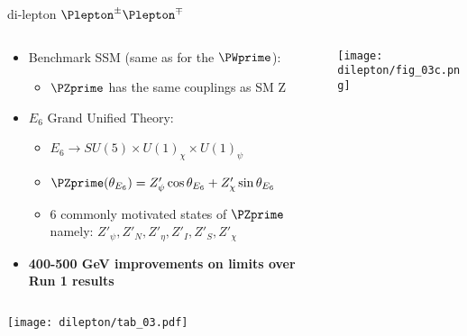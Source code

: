\documentclass[8pt]{beamer}
\begin{document}
\begin{frame}{\large di-lepton $\Plepton^{\pm}\Plepton^{\mp}$}

\begin{columns}
  \begin{column}{5.5cm}
  
  \begin{itemize}
    \item Benchmark SSM (same as for the $\PWprime$):
    \begin{itemize}
      \item $\PZprime$ has the same couplings as SM Z
    \end{itemize}
    \item $E_6$ Grand Unified Theory:
    \begin{itemize}
      \item $E_6 \rightarrow SU(5) \times U(1)_{\chi} \times U(1)_{\psi}$
      \item $\PZprime(\theta_{E_6}) = Z'_{\psi}\cos\theta_{E_6} + Z'_{\chi}\sin\theta_{E_6}$
      \item 6 commonly motivated states of $\PZprime$ namely:
	    $Z'_{\psi}, Z'_{N}, Z'_{\eta}, Z'_{I}, Z'_{S}, Z'_{\chi}$
    \end{itemize}
    \item {\bf 400-500 GeV improvements on limits over Run 1 results}
  \end{itemize}
  
  
  \end{column}
  \begin{column}{7cm}
  \texttt{[image: dilepton/fig\_03c.png]}\\
  
  \end{column}
\end{columns}

{\centering
\texttt{[image: dilepton/tab\_03.pdf]}\\
}


\end{frame}
\end{document}
